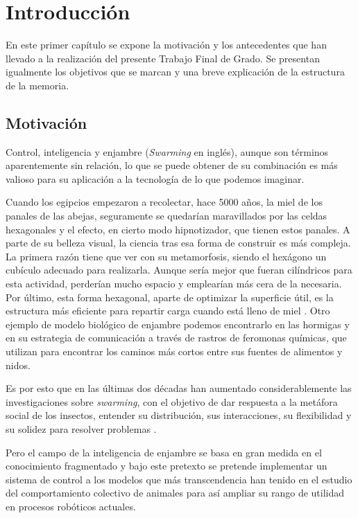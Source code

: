 \chapter{Introducción} \label{cap1}

En este primer capítulo se expone la motivación y los antecedentes que han llevado a la realización del presente Trabajo Final de Grado. Se presentan igualmente los objetivos que se marcan y una breve explicación de la estructura de la memoria.

\section{Motivación} \label{s1_1}
Control, inteligencia y enjambre (\textit{Swarming} en inglés), aunque son términos aparentemente sin relación, lo que se puede obtener de su combinación es más valioso para su aplicación a la tecnología de lo que podemos imaginar.

Cuando los egipcios empezaron a recolectar, hace 5000 años, la miel de los panales de las abejas, seguramente se quedarían maravillados por las celdas hexagonales y el efecto, en cierto modo hipnotizador, que tienen estos panales. A parte de su belleza visual, la ciencia tras esa forma de construir es más compleja. La primera razón tiene que ver con su metamorfosis, siendo el hexágono un cubículo adecuado para realizarla. Aunque sería mejor que fueran cilíndricos para esta actividad, perderían mucho espacio y emplearían más cera de la necesaria. Por último, esta forma hexagonal, aparte de optimizar la superficie útil, es la estructura más eficiente para repartir carga cuando está lleno de miel \cite{abejasecocolmena}. Otro ejemplo de modelo biológico de enjambre podemos encontrarlo en las hormigas y en su estrategia de comunicación a través de rastros de feromonas químicas, que utilizan para encontrar los caminos más cortos entre sus fuentes de alimentos y nidos.

Es por esto que en las últimas dos décadas han aumentado considerablemente las investigaciones sobre \textit{swarming}, con el objetivo de dar respuesta a la metáfora social de los insectos, entender su distribución, sus interacciones, su flexibilidad y su solidez para resolver problemas \cite{bonabeau1999swarm}.

Pero el campo de la inteligencia de enjambre se basa en gran medida en el conocimiento fragmentado y bajo este pretexto se pretende implementar un sistema de control a los modelos que más transcendencia han tenido en el estudio del comportamiento colectivo de animales para así ampliar su rango de utilidad en procesos robóticos actuales.

